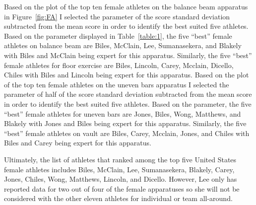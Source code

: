 \documentclass[12pt]{article}
\begin{document}
Based on the plot of the top ten female athletes on the balance beam apparatus in Figure~\ref{fig:FA} I selected the parameter of 
the score standard deviation subtracted from the mean score in order to identify the best suited five 
athletes. Based on the parameter displayed in Table~\ref{table:1}, the five ``best'' female athletes on balance beam are Biles, McClain, 
Lee, Sumanasekera, and Blakely with Biles and McClain being expert for this apparatus. Similarly, the five ``best'' 
female athletes for floor exercise are Biles, Lincoln, Carey, 
Mcclain, Dicello, Chiles with Biles and Lincoln being expert for this apparatus. Based on the plot of the top ten 
female athletes on the uneven bars apparatus I selected the parameter of 
half of the score standard deviation subtracted from the mean score in order to identify the best suited five 
athletes. Based on the parameter, the five ``best'' female athletes for uneven bars are Jones, Biles, Wong, 
Matthews, and Blakely with Jones and Biles being expert for this apparatus. Similarly, the five ``best'' female 
athletes on vault are Biles, Carey, Mcclain, Jones, 
and Chiles with Biles and Carey being expert for this apparatus.

Ultimately, the list of athletes that ranked among the top five United States female athletes includes Biles, 
McClain, Lee, Sumanasekera, Blakely, Carey, Jones, Chiles, Wong, Matthews, Lincoln, and Dicello. However, Lee 
only has reported data for two out of four of the female apparatuses so she will not be considered with the other 
eleven athletes for individual or team all-around.
\end{document}
